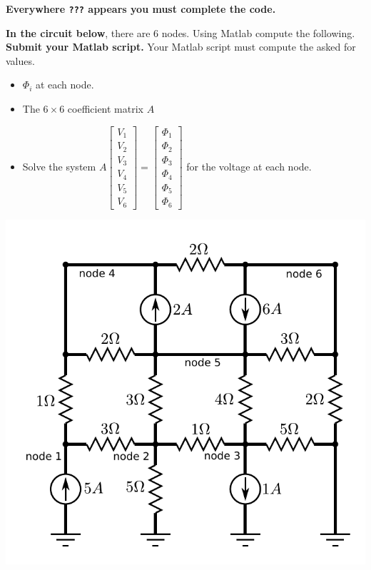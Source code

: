 \documentclass{article}
\begin{document}
{\bf Everywhere \texttt{???} appears you must complete the code.}

{\bf In the circuit below}, there are \(6\) nodes. Using Matlab compute the following. {\bf Submit your Matlab script.} Your Matlab script must compute the asked for values.
\begin{itemize}
\item \(\Phi_i\) at each node. %
\item The \(6 \times 6\) coefficient matrix \(A\)
\item Solve the system 
\(A\begin{bmatrix} V_1 \\ V_2 \\ V_3 \\ V_4 \\ V_5 \\ V_6 \end{bmatrix} = \begin{bmatrix} \Phi_1 \\ \Phi_2 \\ \Phi_3 \\ \Phi_4 \\ \Phi_5 \\ \Phi_6 \end{bmatrix}\)
for the voltage at each node. %
\end{itemize} 
\includegraphics[width = \textwidth]{problem_circuit_1}
\end{document}
